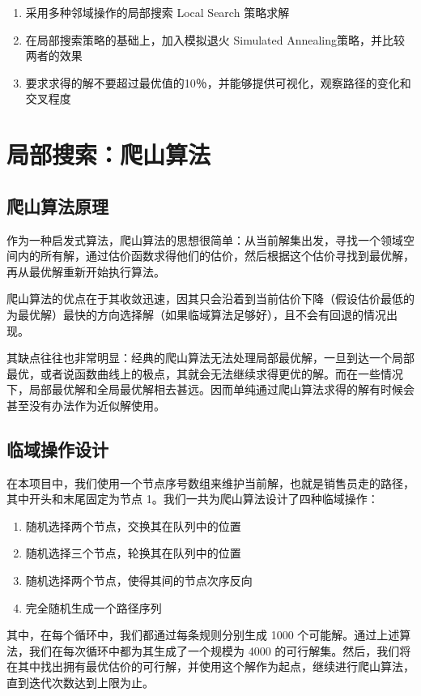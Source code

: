 \begin{enumerate}
\item 采用多种邻域操作的局部搜索 Local Search 策略求解
\item 在局部搜索策略的基础上，加入模拟退火 Simulated Annealing策略，并比较两者的效果
\item 要求求得的解不要超过最优值的10％，并能够提供可视化，观察路径的变化和交叉程度
\end{enumerate}

\section{局部搜索：爬山算法}

\subsection{爬山算法原理}

作为一种启发式算法，爬山算法的思想很简单：从当前解集出发，寻找一个领域空间内的所有解，通过估价函数求得他们的估价，然后根据这个估价寻找到最优解，再从最优解重新开始执行算法。

爬山算法的优点在于其收敛迅速，因其只会沿着到当前估价下降（假设估价最低的为最优解）最快的方向选择解（如果临域算法足够好），且不会有回退的情况出现。

其缺点往往也非常明显：经典的爬山算法无法处理局部最优解，一旦到达一个局部最优，或者说函数曲线上的极点，其就会无法继续求得更优的解。而在一些情况下，局部最优解和全局最优解相去甚远。因而单纯通过爬山算法求得的解有时候会甚至没有办法作为近似解使用。

\subsection{临域操作设计}

在本项目中，我们使用一个节点序号数组来维护当前解，也就是销售员走的路径，其中开头和末尾固定为节点 1。我们一共为爬山算法设计了四种临域操作：

\begin{enumerate}
    \item 随机选择两个节点，交换其在队列中的位置
    \item 随机选择三个节点，轮换其在队列中的位置
    \item 随机选择两个节点，使得其间的节点次序反向
    \item 完全随机生成一个路径序列
\end{enumerate}

其中，在每个循环中，我们都通过每条规则分别生成 1000 个可能解。通过上述算法，我们在每次循环中都为其生成了一个规模为 4000 的可行解集。然后，我们将在其中找出拥有最优估价的可行解，并使用这个解作为起点，继续进行爬山算法，直到迭代次数达到上限为止。

